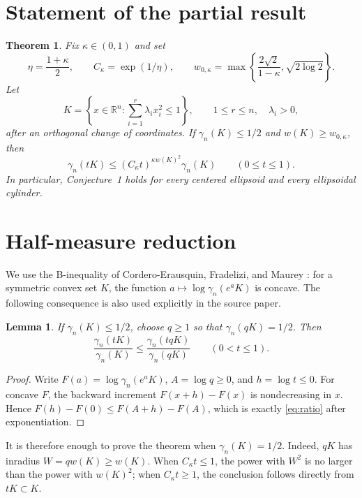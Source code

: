 \documentclass[11pt]{article}
\newtheorem{theorem}{Theorem}
\newtheorem{lemma}{Lemma}
\newcommand{\R}{\mathbb{R}}
\begin{document}
\section{Statement of the partial result}

\begin{theorem}\label{thm:main}
Fix $\kappa\in(0,1)$ and set
\begin{equation}\label{eq:constants}
 \eta=\frac{1+\kappa}{2},\qquad
 C_\kappa=\exp(1/\eta),\qquad
 w_{0,\kappa}=\max\left\{
 \frac{2\sqrt2}{1-\kappa},\sqrt{2\log2}\right\}.
\end{equation}
Let
\begin{equation}\label{eq:cylinder}
 K=\left\{x\in\R^n:\sum_{i=1}^r\lambda_i x_i^2\le1\right\},
 \qquad 1\le r\le n,\quad \lambda_i>0,
\end{equation}
after an orthogonal change of coordinates.  If $\gamma_n(K)\le1/2$ and
$w(K)\ge w_{0,\kappa}$, then
\[
 \gamma_n(tK)\le(C_\kappa t)^{\kappa w(K)^2}\gamma_n(K)
 \qquad(0\le t\le1).
\]
In particular, Conjecture~1 holds for every centered ellipsoid and every
ellipsoidal cylinder.
\end{theorem}

\section{Half-measure reduction}

We use the B-inequality of Cordero-Erausquin, Fradelizi, and Maurey
\cite{CFM}: for a symmetric convex set $K$, the function
$a\mapsto\log\gamma_n(e^aK)$ is concave.  The following consequence is also
used explicitly in the source paper.

\begin{lemma}\label{lem:normalize}
If $\gamma_n(K)\le1/2$, choose $q\ge1$ so that $\gamma_n(qK)=1/2$.  Then
\begin{equation}\label{eq:ratio}
 \frac{\gamma_n(tK)}{\gamma_n(K)}
 \le\frac{\gamma_n(tqK)}{\gamma_n(qK)}
 \qquad(0<t\le1).
\end{equation}
\end{lemma}

\begin{proof}
Write $F(a)=\log\gamma_n(e^aK)$, $A=\log q\ge0$, and $h=\log t\le0$.
For concave $F$, the backward increment $F(x+h)-F(x)$ is nondecreasing in
$x$.  Hence $F(h)-F(0)\le F(A+h)-F(A)$, which is exactly
\eqref{eq:ratio} after exponentiation.
\end{proof}

It is therefore enough to prove the theorem when $\gamma_n(K)=1/2$.
Indeed, $qK$ has inradius $W=qw(K)\ge w(K)$.  When $C_\kappa t\le1$, the
power with $W^2$ is no larger than the power with $w(K)^2$; when
$C_\kappa t\ge1$, the conclusion follows directly from $tK\subset K$.
\end{document}
